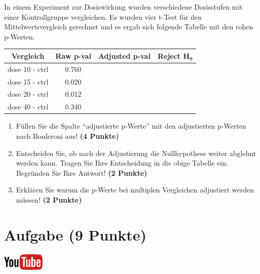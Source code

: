 \documentclass[a4paper, 10pt]{scrartcl}\usepackage[]{graphicx}\usepackage[]{xcolor}
\begin{document}
In einem Experiment zur Dosiswirkung wurden verschiedene Dosisstufen mit
einer Kontrollgruppe vergleichen. Es wurden vier t-Test f{\"u}r den
Mittelwertsvergleich gerechnet und es ergab sich folgende Tabelle mit den
rohen p-Werten.



\begin{center}
  \Large
  \begin{tabular}{c|c|c|c}
    \textbf{Vergleich} & \textbf{Raw p-val} & \textbf{Adjusted p-val} &
                                                                        \textbf{Reject $\boldsymbol{H_0}$} \strut\\
    \hline
    dose 10 - ctrl  & 0.760 &  &\strut\\
    \hline
    dose 15 - ctrl  & 0.020 & &\strut\\
    \hline
    dose 20 - ctrl  & 0.012 & &\strut\\
    \hline
    dose 40 - ctrl  & 0.340 & &\strut\\
  \end{tabular}
\end{center}

\begin{enumerate}
\item F{\"u}llen Sie die Spalte "`adjustierte p-Werte"' mit den adjustierten
  p-Werten nach Bonferoni aus! \textbf{(4 Punkte)}
\item Entscheiden Sie, ob nach der Adjustierung die Nullhypothese weiter
  abglehnt werden kann. Tragen Sie Ihre Entscheidung in die obige Tabelle
  ein. Begr{\"u}nden Sie Ihre Antwort! \textbf{(2 Punkte)}
\item Erkl{\"a}ren Sie warum die p-Werte bei multiplen Vergleichen
  adjustiert werden m{\"u}ssen! \textbf{(2 Punkte)}
\end{enumerate}

\vspace{1Ex}

 
\clearpage

\section{Aufgabe \hfill (9 Punkte)}

 \hfill\href{https://youtu.be/RagTFFKFbFg}{\includegraphics[width =
   2cm]{img/youtube}}\\[1Ex]
\end{document}
